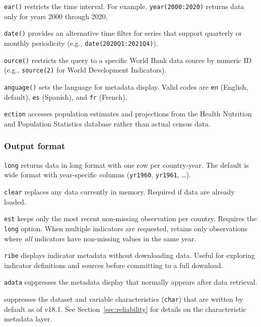\documentclass[bib]{statapress}
\begin{document}
\hangpara
\texttt{ear(\ststring)} restricts the time interval. For example, \texttt{year(2000:2020)} returns data only for years 2000 through 2020.

\hangpara
\texttt{date(\ststring)} provides an alternative time filter for series that
support quarterly or monthly periodicity (e.g., \texttt{date(2020Q1:2021Q4)}).

\hangpara
\texttt{ource(\ststring)} restricts the query to a specific World
Bank data source by numeric ID (e.g., \texttt{source(2)} for World Development
Indicators).

\hangpara
\texttt{anguage(\ststring)} sets the language for metadata display. Valid codes are \texttt{en} (English, default), \texttt{es} (Spanish), and \texttt{fr} (French).

\hangpara
\texttt{ection} accesses population estimates and projections from the Health Nutrition and Population Statistics database rather than actual census data.

\subsubsection*{Output format}

\hangpara
\texttt{long} returns data in long format with one row per country-year. The default is wide format with year-specific columns (\texttt{yr1960}, \texttt{yr1961}, \ldots).

\hangpara
\texttt{clear} replaces any data currently in memory. Required if data are already loaded.

\hangpara
\texttt{est} keeps only the most recent non-missing observation per country. Requires the \texttt{long} option. When multiple indicators are requested, retains only observations where \textit{all} indicators have non-missing values in the same year.

\hangpara
\texttt{ribe} displays indicator metadata without downloading data. Useful for exploring indicator definitions and sources before committing to a full download.

\hangpara
\texttt{adata} suppresses the metadata display that normally appears after data retrieval.

\hangpara
\texttt{} suppresses the dataset and variable characteristics
(\texttt{char}) that are written by default as of v18.1. See
Section~\ref{sec:reliability} for details on the characteristic metadata layer.
\end{document}
